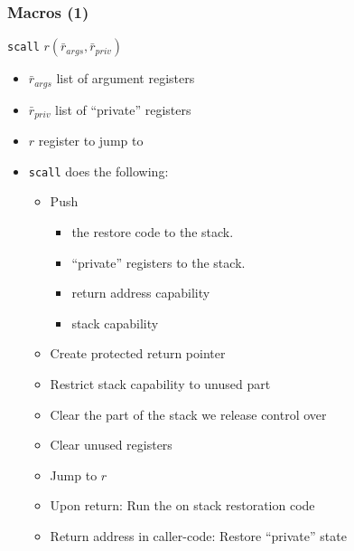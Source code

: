 \documentclass{beamer}
\newcommand{\var}[1]{\mathit{#1}}
\begin{document}
\begin{frame}
  \frametitle{Macros (1)}
\texttt{scall} $r(\bar{r}_{\var{args}},\bar{r}_{\var{priv}})$
    \begin{itemize}
    \item<1-> $\bar{r}_{\var{args}}$ list of argument registers
    \item<1-> $\bar{r}_{\var{priv}}$ list of ``private'' registers
    \item<1-> $r$ register to jump to
    \item<2-> \texttt{scall} does the following:
      \begin{itemize}
      \item<3-> Push
        \begin{itemize}
        \item the restore code to the stack.
        \item ``private'' registers to the stack.
        \item return address capability 
        \item stack capability
        \end{itemize}
      \item<4-> Create protected return pointer
      \item<5-> Restrict stack capability to unused part 
      \item<6-> Clear the part of the stack we release control over
      \item<6-> Clear unused registers
      \item<7-> Jump to $r$
      \item<8-> Upon return: Run the on stack restoration code
      \item<9-> Return address in caller-code:  Restore ``private'' state
      \end{itemize}
    \end{itemize}
\end{frame}
\end{document}
